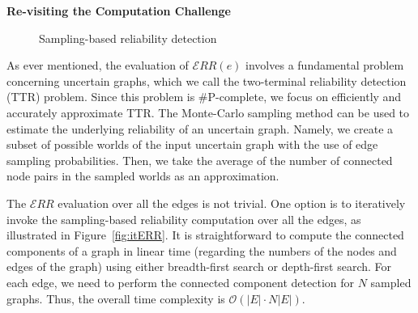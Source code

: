 \textbf{Re-visiting the Computation Challenge}~~
\begin{figure}
  \vspace{-7pt}
    \vspace{-5pt}
    \caption{Sampling-based reliability detection}
    \label{fig:computationERR}
    \vspace{-7pt}
\end{figure} 
As ever mentioned, 
the evaluation of $\mathcal{E}RR(e)$ involves a fundamental problem concerning uncertain graphs, which we call 
the two-terminal reliability detection (TTR) problem. 
Since this problem is \#P-complete, we focus on efficiently and accurately approximate TTR.
The Monte-Carlo sampling method can be used to estimate the underlying reliability of an uncertain graph. 
Namely, we create a subset of possible worlds of the input uncertain graph with the use of edge sampling probabilities. 
Then, we take the average of the number of connected node pairs in the sampled worlds as an approximation. 
 
The $\mathcal{E}RR$ evaluation over all the edges is not trivial. 
One option is to iteratively invoke the sampling-based reliability computation over all the edges, 
as illustrated in Figure~\ref{fig:itERR}. 
It is straightforward to compute the connected components of a graph in linear time (regarding the numbers of the nodes and edges of the graph) using either breadth-first search or depth-first search.
For each edge, we need to perform the connected component detection for $N$ sampled graphs.
Thus, the overall time complexity is $\mathcal{O}(|E|\cdot N |E|)$.

